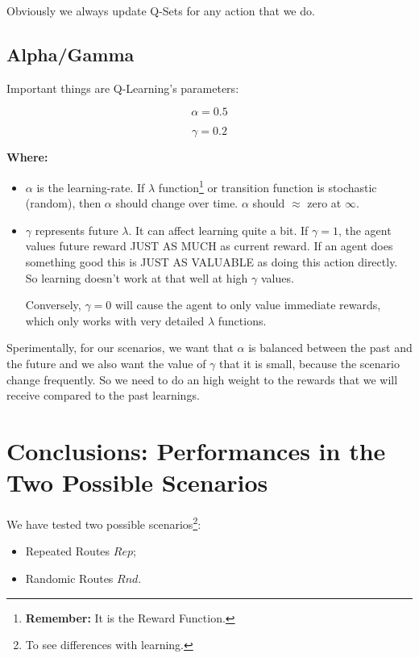 \documentclass[12pt]{article}
\begin{document}
    Obviously we always update Q-Sets for any action that we do.
    
\subsection{Alpha/Gamma}

Important things are Q-Learning's parameters:

\[
    \alpha= 0.5
\]

\[
    \gamma= 0.2
\]

\textbf{Where:}

\begin{itemize}

    \item $\alpha$ is the learning-rate. If $\lambda$ function\footnote{\textbf{Remember:} It is the Reward Function.} or transition function is stochastic (random), then $\alpha$ should change over time. $\alpha$ should $\approx$ zero at $\infty$.

    \item $\gamma$ represents future $\lambda$. It can affect learning quite a bit. If $\gamma = 1$, the agent values future reward JUST AS MUCH as current reward. If an agent does something good this is JUST AS VALUABLE as doing this action directly. So learning doesn't work at that well at high $\gamma$ values.

    Conversely, $\gamma = 0$ will cause the agent to only value immediate rewards, which only works with very detailed $\lambda$ functions.

\end{itemize}

Sperimentally, for our scenarios, we want that $\alpha$ is balanced between the past and the future and we also want the value of $\gamma$ that it is small, because the scenario change frequently. So we need to do an high weight to the rewards that we will receive compared to the past learnings.  


\section{Conclusions: Performances in the Two Possible Scenarios}

We have tested two possible scenarios\footnote{To see differences with learning.}:

\begin{itemize}

    \item Repeated Routes $Rep$;
    
    \item Randomic Routes $Rnd$.
    
\end{itemize}
\end{document}
